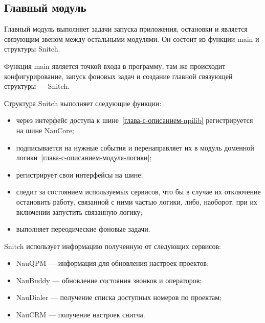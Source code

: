 \subsection{Главный модуль}

Главный модуль выполняет задачи запуска приложения, остановки и является связующим звеном между остальными модулями.
Он состоит из функции main и структуры Snitch.

Функция main является точкой входа в программу, там же происходит конфигурирование, запуск фоновых задач
и создание главной связующей структуры --- Snitch.

Структура Snitch выполняет следующие функции:
\begin{itemize}
    \item через интерфейс доступа к шине~\ref{глава-с-описанием-npilib}
    регистрируется на шине NauCore;
    \item подписывается на нужные события %
    и перенаправляет их в модуль доменной логики~\ref{глава-с-описанием-модуля-логики};
    \item регистрирует свои интерфейсы %
    на шине;
    \item следит за состоянием используемых сервисов, что бы в случае их отключение остановить работу, связанной с ними частью логики,
    либо, наоборот, при их включении запустить связанную логику;
    \item выполняет переодические фоновые задачи.
\end{itemize}

Snitch использует информацию полученную от следующих сервисов:
\begin{itemize}
    \item NauQPM --- информация для обновления настроек проектов;
    \item NauBuddy --- обновление состояния звонков и операторов;
    \item NauDialer --- получение списка доступных номеров по проектам;
    \item NauCRM --- получение настроек снитча.
\end{itemize}

